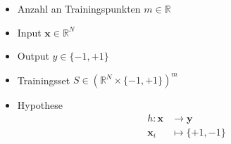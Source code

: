 \begin{frame}
    \begin{itemize}
        \item Anzahl an Trainingspunkten $ m \in \mathbb{R} $
        \item Input $ \boldsymbol{x} \in \mathbb{R}^N $
        \item Output $ y \in \{ -1, +1 \} $
        \item Trainingsset $S \in (\mathbb{R}^N \times \{ -1, +1 \})^m $
    \end{itemize}

    \vspace{2mm}

    \begin{itemize}
        \item Hypothese
            \begin{align*}
                h: \boldsymbol{x} &\to \boldsymbol{y} \\
                \boldsymbol{x}_i &\mapsto \{ +1, -1 \} \\
            \end{align*}
    \end{itemize}
\end{frame}

